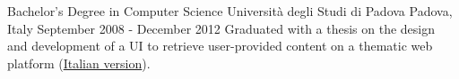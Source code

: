 

\begin{cventries}

  \cventry
    {Bachelor's Degree in Computer Science} %
    {Università degli Studi di Padova} %
    {Padova, Italy} %
    {September 2008 - December 2012} %
    {
      Graduated with a thesis on the design and development of a UI to retrieve user-provided content on a thematic web platform (\href{https://s3-eu-west-1.amazonaws.com/eu.nicolamoretto/tesi.pdf}{Italian version}).
    }

\end{cventries}
